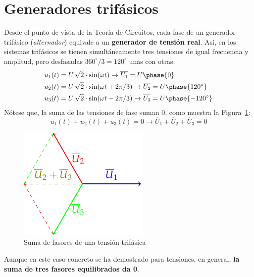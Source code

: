 \documentclass[11pt]{book} %
\begin{document}
	\section{Generadores trifásicos}
	Desde el punto de vista de la Teoría de Circuitos, cada fase de un generador trifásico (\textit{alternador}) equivale a un \textbf{generador de tensión real}. Así, en los sistemas trifásicos se tienen simultáneamente tres tensiones de igual frecuencia y amplitud, pero desfasadas $360^\circ/3=120^\circ$ unas con otras:
	\begin{align*}
		u_1(t) &= U\,\sqrt{2}\cdot \sin(\omega t)\rightarrow  \overline{U_1} = U\phase{0}\\
		u_2(t) &= U\,\sqrt{2} \cdot\sin(\omega t + 2\pi/3) \rightarrow  \overline{U_2} = U\phase{120^\circ}\\
		u_3(t) &= U\,\sqrt{2}\cdot \sin(\omega t - 2\pi/3) \rightarrow  \overline{U_3} = U\phase{-120^\circ}
	\end{align*}
	Nótese que, la suma de las tensiones de fase suman 0, como muestra la Figura~\ref{fig.fasoressumacero}:
	\begin{equation*}
		u_1(t) + u_2(t) + u_3(t) = 0\rightarrow \overline{U}_1 + \overline{U}_2 + \overline{U}_3 = 0
	\end{equation*}
	\begin{figure}
		\centering
		\includegraphics{../figs/FasoresSumaCero.pdf}
		\caption{Suma de fasores de una tensión trifásica}
		\label{fig.fasoressumacero}
	\end{figure}
	\begin{remark}
	    Aunque en este caso concreto se ha demostrado para tensiones, en general, \textbf{la suma de tres fasores equilibrados da 0}.
	\end{remark}
	
\end{document}
